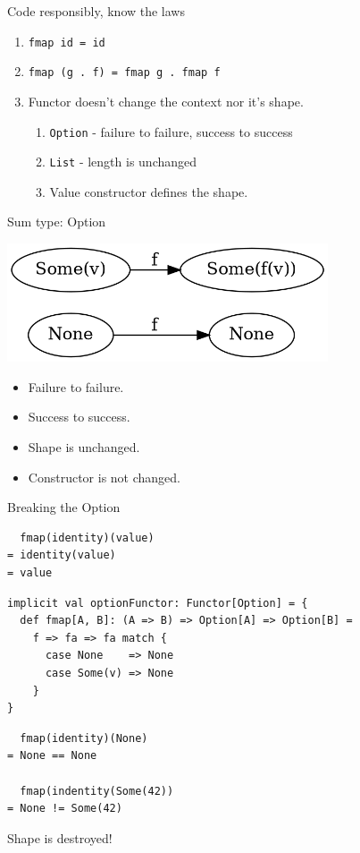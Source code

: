 \documentclass[presentation,aspectratio=169,smaller]{beamer}
\begin{document}
\begin{frame}[label={sec:org4c538c1},fragile]{Code responsibly, know the laws}
 \begin{enumerate}
\item <1-> \texttt{fmap id = id}
\item <2-> \texttt{fmap (g . f) = fmap g . fmap f}
\item <3-> Functor doesn't change the context nor it's shape.
\begin{enumerate}
\item \texttt{Option} - failure to failure, success to success
\item \texttt{List} - length is unchanged
\item Value constructor defines the shape.
\end{enumerate}
\end{enumerate}
\end{frame}

\begin{frame}[label={sec:org764189b}]{Sum type: Option}
\begin{center}
\includegraphics[height=3.5cm]{.dot/functor-option.png}
\end{center}

\begin{itemize}
\item Failure to failure.
\item Success to success.
\item Shape is unchanged.
\item Constructor is not changed.
\end{itemize}
\end{frame}

\begin{frame}[label={sec:org9cfe1e4},fragile]{Breaking the Option}
 \begin{verbatim}
  fmap(identity)(value)
= identity(value)
= value
\end{verbatim}

\pause

\begin{verbatim}
implicit val optionFunctor: Functor[Option] = {
  def fmap[A, B]: (A => B) => Option[A] => Option[B] =
    f => fa => fa match {
      case None    => None
      case Some(v) => None
    }
}
\end{verbatim}

\pause

\begin{verbatim}
  fmap(identity)(None)
= None == None

  fmap(indentity(Some(42))
= None != Some(42)
\end{verbatim}

Shape is destroyed!
\end{frame}
\end{document}
